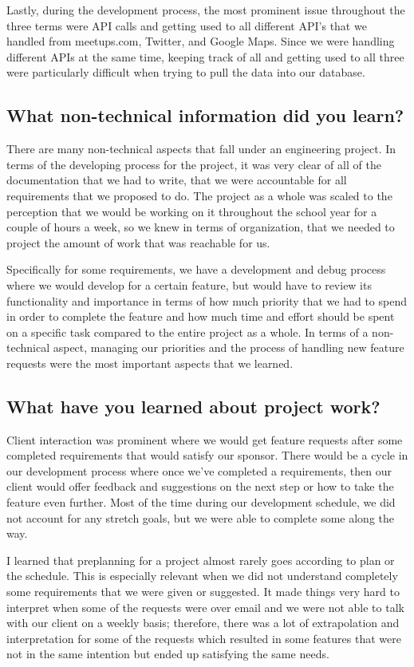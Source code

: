 \documentclass[draftclsnofoot,10pt,onecolumn]{IEEEtran} %
\begin{document}
Lastly, during the development process, the most prominent issue throughout the
three terms were API calls and getting used to all different API’s that we
handled from meetups.com, Twitter, and Google Maps. Since we were handling
different APIs at the same time, keeping track of all and getting used to all
three were particularly difficult when trying to pull the data into our
database.

\subsection{What non-technical information did you learn?}
There are many non-technical aspects that fall under an engineering project. In
terms of the developing process for the project, it was very clear of all of the
documentation that we had to write, that we were accountable for all
requirements that we proposed to do. The project as a whole was scaled to the
perception that we would be working on it throughout the school year for a
couple of hours a week, so we knew in terms of organization, that we needed to
project the amount of work that was reachable for us. 

Specifically for some requirements, we have a development and debug process
where we would develop for a certain feature, but would have to review its
functionality and importance in terms of how much priority that we had to spend
in order to complete the feature and how much time and effort should be spent on
a specific task compared to the entire project as a whole. In terms of a
non-technical aspect, managing our priorities and the process of handling new
feature requests were the most important aspects that we learned.

\subsection{What have you learned about project work?}
Client interaction was prominent where we would get feature requests after some
completed requirements that would satisfy our sponsor. There would be a cycle in
our development process where once we’ve completed a requirements, then our
client would offer feedback and suggestions on the next step or how to take the
feature even further. Most of the time during our development schedule, we did
not account for any stretch goals, but we were able to complete some along the
way.

I learned that preplanning for a project almost rarely goes according to plan or
the schedule. This is especially relevant when we did not understand completely
some requirements that we were given or suggested. It made things very hard to
interpret when some of the requests were over email and we were not able to talk
with our client on a weekly basis; therefore, there was a lot of extrapolation
and interpretation for some of the requests which resulted in some features that
were not in the same intention but ended up satisfying the same needs.
\end{document}
